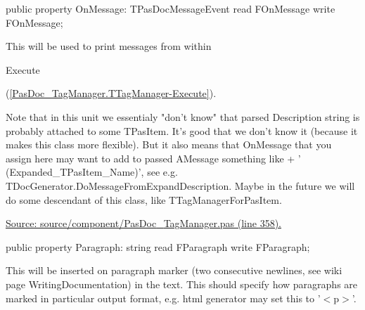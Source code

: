\documentclass{report}
\newif\ifpdf
\begin{document}
\begin{list}{}{
\setlength{\itemindent}{0cm}
\setlength{\listparindent}{0cm}
\setlength{\leftmargin}{\evensidemargin}
\addtolength{\leftmargin}{\tmplength}
\settowidth{\labelsep}{X}
\addtolength{\leftmargin}{\labelsep}
\setlength{\labelwidth}{\tmplength}
}
\label{PasDoc_TagManager.TTagManager-OnMessage}
\item[\textbf{OnMessage}\hfill]
\ifpdf
\begin{flushleft}
\fi
\begin{ttfamily}
public property OnMessage: TPasDocMessageEvent read FOnMessage write FOnMessage;\end{ttfamily}

\ifpdf
\end{flushleft}
\fi


\par This will be used to print messages from within \begin{ttfamily}Execute\end{ttfamily}(\ref{PasDoc_TagManager.TTagManager-Execute}).

Note that in this unit we essentialy "don't know" that parsed Description string is probably attached to some TPasItem. It's good that we don't know it (because it makes this class more flexible). But it also means that OnMessage that you assign here may want to add to passed AMessage something like + ' (Expanded{\_}TPasItem{\_}Name)', see e.g. TDocGenerator.DoMessageFromExpandDescription. Maybe in the future we will do some descendant of this class, like TTagManagerForPasItem.\par
\href{https://github.com/pasdoc/pasdoc/blob/master/source/component/PasDoc_TagManager.pas#L358}{Source: source/component/PasDoc{\_}TagManager.pas (line 358).}\label{PasDoc_TagManager.TTagManager-Paragraph}
\item[\textbf{Paragraph}\hfill]
\ifpdf
\begin{flushleft}
\fi
\begin{ttfamily}
public property Paragraph: string read FParagraph write FParagraph;\end{ttfamily}

\ifpdf
\end{flushleft}
\fi


\par This will be inserted on paragraph marker (two consecutive newlines, see wiki page WritingDocumentation) in the text. This should specify how paragraphs are marked in particular output format, e.g. html generator may set this to '{$<$}p{$>$}'.


\end{list}
\end{document}
